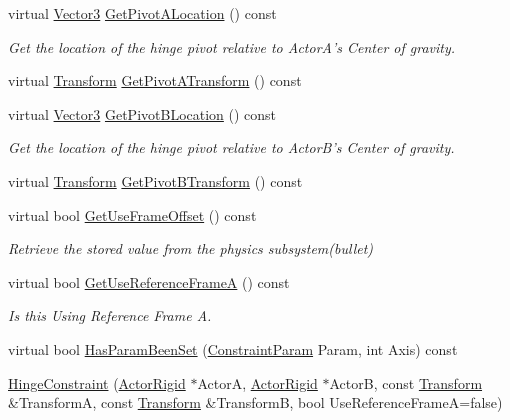 \begin{DoxyCompactItemize}
virtual \hyperlink{classphys_1_1Vector3}{Vector3} \hyperlink{classphys_1_1HingeConstraint_a099fec821a9194cd3c8268d764ec8ea8}{GetPivotALocation} () const 
\begin{DoxyCompactList}\small\item\em Get the location of the hinge pivot relative to ActorA's Center of gravity. \item\end{DoxyCompactList}\item 
virtual \hyperlink{classphys_1_1Transform}{Transform} \hyperlink{classphys_1_1HingeConstraint_ac210cfa2fe2d4d6b2bf9e626441546b7}{GetPivotATransform} () const 
\item 
virtual \hyperlink{classphys_1_1Vector3}{Vector3} \hyperlink{classphys_1_1HingeConstraint_a7b0ed683e55a1500e4c8cc6c04e8e140}{GetPivotBLocation} () const 
\begin{DoxyCompactList}\small\item\em Get the location of the hinge pivot relative to ActorB's Center of gravity. \item\end{DoxyCompactList}\item 
virtual \hyperlink{classphys_1_1Transform}{Transform} \hyperlink{classphys_1_1HingeConstraint_ac328b988f24c490084fdb4567cd5df06}{GetPivotBTransform} () const 
\item 
virtual bool \hyperlink{classphys_1_1HingeConstraint_a411bf09ec4aade190de13eb5a7f46b8a}{GetUseFrameOffset} () const 
\begin{DoxyCompactList}\small\item\em Retrieve the stored value from the physics subsystem(bullet) \item\end{DoxyCompactList}\item 
virtual bool \hyperlink{classphys_1_1HingeConstraint_ab90932d63a43ba7a55afadbe396a0951}{GetUseReferenceFrameA} () const 
\begin{DoxyCompactList}\small\item\em Is this Using Reference Frame A. \item\end{DoxyCompactList}\item 
virtual bool \hyperlink{classphys_1_1HingeConstraint_ad8d648a1c484966a828e7af71286e8b4}{HasParamBeenSet} (\hyperlink{namespacephys_aa1e7cf2d7efcaeaeac304f711e7564e8}{ConstraintParam} Param, int Axis) const 
\item 
\hyperlink{classphys_1_1HingeConstraint_a725b932ea223d2218f0b7a03b61e1650}{HingeConstraint} (\hyperlink{classphys_1_1ActorRigid}{ActorRigid} $\ast$ActorA, \hyperlink{classphys_1_1ActorRigid}{ActorRigid} $\ast$ActorB, const \hyperlink{classphys_1_1Transform}{Transform} \&TransformA, const \hyperlink{classphys_1_1Transform}{Transform} \&TransformB, bool UseReferenceFrameA=false)

\end{DoxyCompactItemize}
